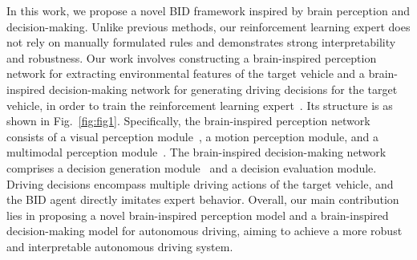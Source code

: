 In this work, we propose a novel BID framework inspired by brain perception and decision-making. 
Unlike previous methods, our reinforcement learning expert does not rely on manually formulated rules and demonstrates strong interpretability and robustness. 
Our work involves constructing a brain-inspired perception network for extracting environmental features of the target vehicle and a brain-inspired decision-making network for generating driving decisions for the target vehicle, in order to train the reinforcement learning expert~\cite{kahn2021land}. 
Its structure is as shown in Fig.~\ref{fig:fig1}. 
Specifically, the brain-inspired perception network consists of a visual perception module~\cite{al2018brain}, a motion perception module, and a multimodal perception module~\cite{yu2023brain}. 
The brain-inspired decision-making network comprises a decision generation module~\cite{schirner2023learning} and a decision evaluation module. 
Driving decisions encompass multiple driving actions of the target vehicle, and the BID agent directly imitates expert behavior. 
Overall, our main contribution lies in proposing a novel brain-inspired perception model and a brain-inspired decision-making model for autonomous driving, aiming to achieve a more robust and interpretable autonomous driving system.






